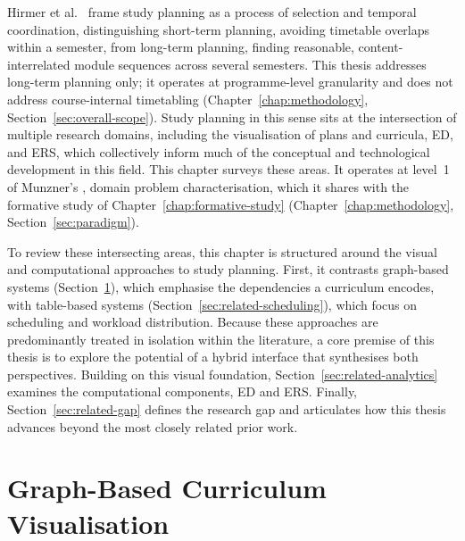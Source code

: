 \label{chap:related-work}

Hirmer et al.~\cite{hirmer_requirements_2022} frame study planning as a process of selection and temporal coordination, distinguishing short-term planning, avoiding timetable overlaps within a semester, from long-term planning, finding reasonable, content-interrelated module sequences across several semesters. This thesis addresses long-term planning only; it operates at programme-level granularity and does not address course-internal timetabling (Chapter~\ref{chap:methodology}, Section~\ref{sec:overall-scope}). Study planning in this sense sits at the intersection of multiple research domains, including the visualisation of plans and curricula,
ED, and ERS, which collectively inform much of the conceptual and technological development in this field.
This chapter surveys these areas. It operates at level~1 of Munzner's , domain problem characterisation, which it shares with the formative study of Chapter~\ref{chap:formative-study} (Chapter~\ref{chap:methodology}, Section~\ref{sec:paradigm}).

To review these intersecting areas, this chapter is structured around the visual and computational approaches to study planning. First, it contrasts graph-based systems (Section~\ref{sec:related-visualisation}), which emphasise the dependencies a curriculum encodes, with table-based systems (Section~\ref{sec:related-scheduling}), which focus on scheduling and workload distribution. Because these approaches are predominantly treated in isolation within the literature, a core premise of this thesis is to explore the potential of a hybrid interface that synthesises both perspectives. Building on this visual foundation, Section~\ref{sec:related-analytics} examines the computational components, ED and ERS. Finally, Section~\ref{sec:related-gap} defines the research gap and articulates how this thesis advances beyond the most closely related prior work.

\section{Graph-Based Curriculum Visualisation}
\label{sec:related-visualisation}

